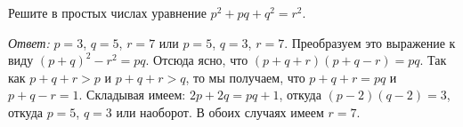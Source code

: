 Решите в простых числах уравнение $p^2 + p q + q^2 = r^2$.

\solution
\emph{Ответ:} $p = 3$, $q = 5$, $r = 7$ или $p = 5$, $q = 3$, $r = 7$.
Преобразуем это выражение к виду $(p + q)^2 - r^2 = p q$.
Отсюда ясно, что $(p + q + r) (p + q - r) = p q$.
Так как $p + q + r > p$ и $p + q + r > q$, то мы получаем, что $p + q + r = p q$
и $p + q - r = 1$.
Складывая имеем: $2 p + 2 q = p q + 1$, откуда $(p - 2) (q - 2) = 3$, откуда
$p = 5$, $q = 3$ или наоборот.
В обоих случаях имеем $r = 7$.

